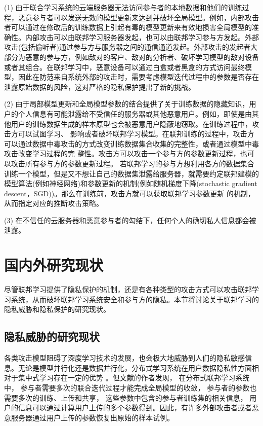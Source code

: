 (1) 由于联合学习系统的云端服务器无法访问参与者的本地数据和他们的训练过程，恶意参与者可以发送无效的模型更新来达到并破坏全局模型。例如，内部攻击者可以通过在修改后的训练数据上引起有毒的模型更新来有效地损害全局模型的准确性。内部攻击可以由联邦学习服务器发起，也可以由联邦学习参与方发起。外部攻击(包括偷听者)通过参与方与服务器之间的通信通道发起。外部攻击的发起者大部分为恶意的参与方，例如敌对的客户、敌对的分析者、破坏学习模型的敌对设备或者其组合。在联邦学习中，恶意设备可以通过白盒或者黑盒的方式访问最终模型，因此在防范来自系统外部的攻击时，需要考虑模型迭代过程中的参数是否存在泄露原始数据的风险，这对严格的隐私保护提出了新的挑战。

(2) 由于局部模型更新和全局模型参数的结合提供了关于训练数据的隐藏知识，用户的个人信息有可能泄露给不受信任的服务器或其他恶意用户。例如，即使是由其他用户的训练数据生成的样本原型也会被恶意用户隐蔽地窃取。在训练过程中，攻击方可以试图学习、 影响或者破坏联邦学习模型。在联邦训练的过程中，攻击方可以通过数据中毒攻击的方式改变训练数据集合收集的完整性，或者通过模型中毒攻击改变学习过程的完 整性。攻击方可以攻击一个参与方的参数更新过程，也可以攻击所有参与方的参数更新过程。
若联邦学习的参与方想利用各方的数据集合训练一个模型，但是又不想让自己的数据集泄露给服务器，就需要约定联邦建模的模型算法(例如神经网络)和参数更新的机制(例如随机梯度下降(stochastic gradient descent，SGD))。那么在训练前，攻击方就可以获取联邦学习参数更新 的机制，从而指定对应的推断攻击策略。

(3) 在不信任的云服务器和恶意参与者的勾结下，任何个人的确切私人信息都会被泄露。


\section{国内外研究现状}
尽管联邦学习提供了隐私保护的机制，还是有各种类型的攻击方式可以攻击联邦学习系统，从而破坏联邦学习系统安全和参与方的隐私。本节将讨论关于联邦学习的隐私威胁和隐私保护的研究现状。


\subsection{隐私威胁的研究现状}
各类攻击模型阻碍了深度学习技术的发展，也会极大地威胁到人们的隐私敏感信息。无论是模型并行化还是数据并行化，分布式学习系统在用户数据隐私性方面相对于集中式学习存在一定的优势 。但文献的作者发现， 在分布式联邦学习系统中， 参与者需要多次的联合迭代过程才能完成全局模型的收敛， 参与者的参数也需要多次的训练、上传和共享， 这些参数中包含的参与者训练集的相关信息， 用户的信息可以通过计算用户上传的多个参数得到。因此，有许多外部攻击者或者恶意服务器通过用户上传的参数恢复出原始的样本试例。

